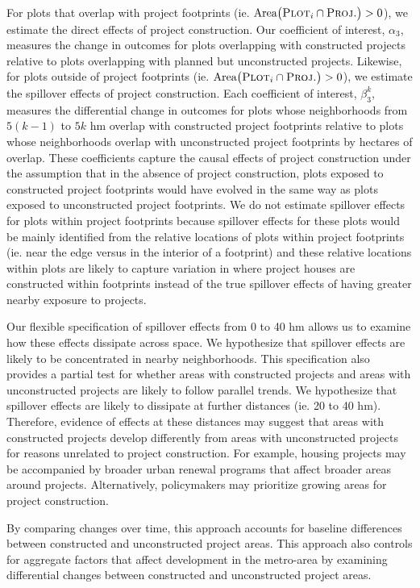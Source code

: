 \documentclass[12pt]{article}
\begin{document}
For plots that overlap with project footprints (ie. $\text{Area}\big(\textsc{Plot}_i  \cap  \textsc{Proj.}\big)>0$), we estimate the direct effects of project construction.  Our coefficient of interest, $\alpha_3$, measures the change in outcomes for plots overlapping with constructed projects relative to plots overlapping with planned but unconstructed projects.  Likewise, for plots outside of project footprints (ie. $\text{Area}\big(\textsc{Plot}_i  \cap  \textsc{Proj.}\big)>0$), we estimate the spillover effects of project construction.  Each coefficient of interest, $\beta_3^{k}$, measures the differential change in outcomes for plots whose neighborhoods from $5(k-1)$ to $5k$ hm overlap with constructed project footprints relative to plots whose neighborhoods overlap with unconstructed project footprints by hectares of overlap.  These coefficients capture the causal effects of project construction under the assumption that in the absence of project construction, plots exposed to constructed project footprints would have evolved in the same way as plots exposed to unconstructed project footprints.  We do not estimate spillover effects for plots within project footprints because spillover effects for these plots would be mainly identified from the relative locations of plots within project footprints (ie. near the edge versus in the interior of a footprint) and these relative locations within plots are likely to capture variation in where project houses are constructed within footprints instead of the true spillover effects of having greater nearby exposure to projects.

Our flexible specification of spillover effects from 0 to 40 hm allows us to examine how these effects dissipate across space.  We hypothesize that spillover effects are likely to be concentrated in nearby neighborhoods.  This specification also provides a partial test for whether areas with constructed projects and areas with unconstructed projects are likely to follow parallel trends.  We hypothesize that spillover effects are likely to dissipate at further distances (ie. 20 to 40 hm).  Therefore, evidence of effects at these distances may suggest that areas with constructed projects develop differently from areas with unconstructed projects for reasons unrelated to project construction.  For example, housing projects may be accompanied by broader urban renewal programs that affect broader areas around projects.  Alternatively, policymakers may prioritize growing areas for project construction.

By comparing changes over time, this approach accounts for baseline differences between constructed and unconstructed project areas.  This approach also controls for aggregate factors that affect development in the metro-area by examining differential changes between constructed and unconstructed project areas.  
\end{document}
